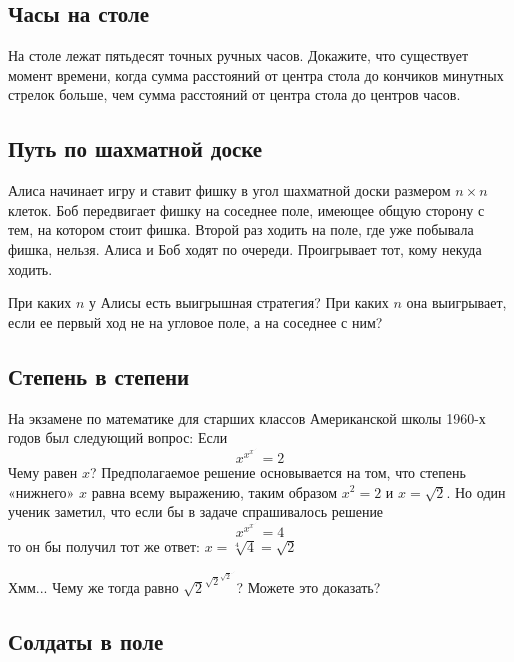 \subsection*{Часы на столе} %



На столе лежат пятьдесят точных ручных часов. 
Докажите, что существует момент времени, когда сумма расстояний от центра стола до кончиков  минутных стрелок  больше, чем сумма расстояний от центра стола до центров часов.

\subsection*{Путь по шахматной доске}    %

Алиса начинает игру и ставит фишку в угол шахматной доски размером $n{\times}n$ клеток. 
Боб передвигает фишку на соседнее поле, имеющее общую сторону с тем, на котором стоит фишка. 
Второй раз ходить на поле, где уже побывала фишка, нельзя.  
Алиса и Боб ходят по очереди. 
Проигрывает тот, кому некуда ходить.

При каких $n$ у Алисы есть выигрышная стратегия?  
При каких $n$ она выигрывает, если ее первый ход не на угловое поле, а на соседнее с ним?




\subsection*{Степень в степени} %



На экзамене по математике для старших классов Американской школы 1960-х годов 
был следующий вопрос:
Если 
$$x^{x^{x^{{\cdot}^{\cdot^{\cdot}}}}}=2$$
Чему равен  $x$? 
Предполагаемое решение основывается на том, что степень «нижнего» $x$ равна всему выражению, таким образом $x^2=2$ и $x=\sqrt{2}$.
Но один ученик заметил, что если бы в задаче спрашивалось решение
$$x^{x^{x^{{\cdot}^{\cdot^{\cdot}}}}}=4$$
то он бы получил тот же ответ: $x=\sqrt[4]{4}=\sqrt{2}$

Хмм... Чему же тогда равно  ${\sqrt{2}}^{{\sqrt{2}}^{{\sqrt{2}}^{{\cdot}^{\cdot^{\cdot}}}}}$? 
Можете это доказать?


\subsection*{Солдаты в поле}        %



